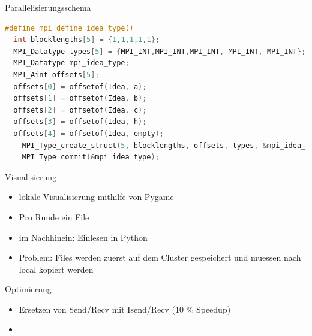 \begin{frame}[fragile]{Parallelisierungsschema}
\begin{lstlisting}[language=C,basicstyle=\small,breaklines=true,keywordstyle=\color{black}]
#define mpi_define_idea_type()                                               
  int blocklengths[5] = {1,1,1,1,1};                                  
  MPI_Datatype types[5] = {MPI_INT,MPI_INT,MPI_INT, MPI_INT, MPI_INT};       
  MPI_Datatype mpi_idea_type;                                                
  MPI_Aint offsets[5];                                                   
  offsets[0] = offsetof(Idea, a);                                            
  offsets[1] = offsetof(Idea, b);                                            
  offsets[2] = offsetof(Idea, c);                                            
  offsets[3] = offsetof(Idea, h);                                            
  offsets[4] = offsetof(Idea, empty);                                        
    MPI_Type_create_struct(5, blocklengths, offsets, types, &mpi_idea_type); 
    MPI_Type_commit(&mpi_idea_type);                                         
\end{lstlisting}
\end{frame}

\begin{frame}[fragile]{Visualisierung}
	\begin{itemize}
		\item lokale Visualisierung mithilfe von Pygame
		\item Pro Runde ein File
		\item im Nachhinein: Einlesen in Python
		\item Problem: Files werden zuerst auf dem Cluster gespeichert und muessen nach local kopiert werden
	\end{itemize}
\end{frame}

\begin{frame}{Optimierung}
	\begin{itemize}
		\item Ersetzen von Send/Recv mit Isend/Recv (10 \% Speedup)
		\item 
	\end{itemize}
\end{frame}
